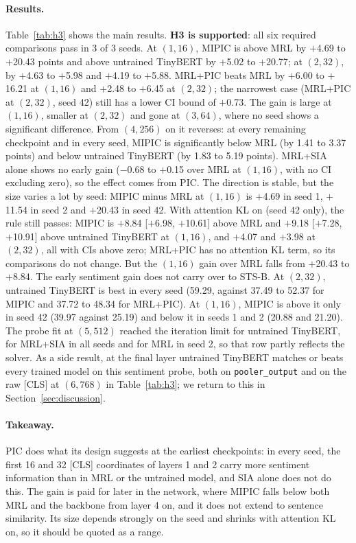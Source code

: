 \paragraph{Results.}
Table~\ref{tab:h3} shows the main results.
\textbf{H3 is supported}: all six required comparisons pass in 3 of 3 seeds.
At $(1,16)$, MIPIC is above MRL by $+$4.69 to $+$20.43 points and above untrained TinyBERT by $+$5.02 to $+$20.77; at $(2,32)$, by $+$4.63 to $+$5.98 and $+$4.19 to $+$5.88.
MRL+PIC beats MRL by $+$6.00 to $+$16.21 at $(1,16)$ and $+$2.48 to $+$6.45 at $(2,32)$; the narrowest case (MRL+PIC at $(2,32)$, seed 42) still has a lower CI bound of $+$0.73.
The gain is large at $(1,16)$, smaller at $(2,32)$ and gone at $(3,64)$, where no seed shows a significant difference.
From $(4,256)$ on it reverses: at every remaining checkpoint and in every seed, MIPIC is significantly below MRL (by 1.41 to 3.37 points) and below untrained TinyBERT (by 1.83 to 5.19 points).
MRL+SIA alone shows no early gain ($-$0.68 to $+$0.15 over MRL at $(1,16)$, with no CI excluding zero), so the effect comes from PIC.
The direction is stable, but the size varies a lot by seed: MIPIC minus MRL at $(1,16)$ is $+$4.69 in seed 1, $+$11.54 in seed 2 and $+$20.43 in seed 42.
With attention KL on (seed 42 only), the rule still passes: MIPIC is $+$8.84 [$+$6.98, $+$10.61] above MRL and $+$9.18 [$+$7.28, $+$10.91] above untrained TinyBERT at $(1,16)$, and $+$4.07 and $+$3.98 at $(2,32)$, all with CIs above zero; MRL+PIC has no attention KL term, so its comparisons do not change.
But the $(1,16)$ gain over MRL falls from $+$20.43 to $+$8.84.
The early sentiment gain does not carry over to STS-B.
At $(2,32)$, untrained TinyBERT is best in every seed (59.29, against 37.49 to 52.37 for MIPIC and 37.72 to 48.34 for MRL+PIC).
At $(1,16)$, MIPIC is above it only in seed 42 (39.97 against 25.19) and below it in seeds 1 and 2 (20.88 and 21.20).
The probe fit at $(5,512)$ reached the iteration limit for untrained TinyBERT, for MRL+SIA in all seeds and for MRL in seed 2, so that row partly reflects the solver.
As a side result, at the final layer untrained TinyBERT matches or beats every trained model on this sentiment probe, both on \texttt{pooler\_output} and on the raw [CLS] at $(6,768)$ in Table~\ref{tab:h3}; we return to this in Section~\ref{sec:discussion}.

\paragraph{Takeaway.}
PIC does what its design suggests at the earliest checkpoints: in every seed, the first 16 and 32 [CLS] coordinates of layers 1 and 2 carry more sentiment information than in MRL or the untrained model, and SIA alone does not do this.
The gain is paid for later in the network, where MIPIC falls below both MRL and the backbone from layer 4 on, and it does not extend to sentence similarity.
Its size depends strongly on the seed and shrinks with attention KL on, so it should be quoted as a range.
